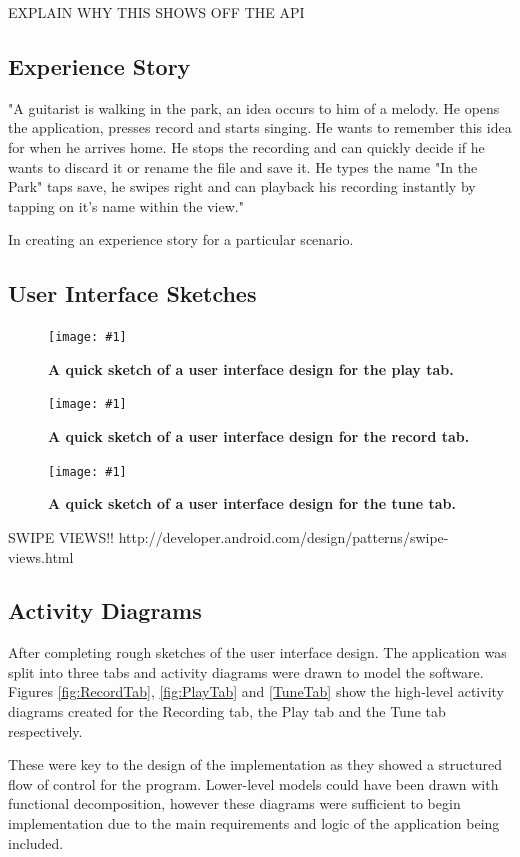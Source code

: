 \documentclass[conference]{acmsiggraph}
\newcommand{\figuremacroF}[3]{
	\begin{figure}[H] %
		\centering
		\texttt{[image: \#1]}
		\caption[#2]{\textbf{#2}}
		\label{fig:#1}
	\end{figure}
}
\begin{document}
EXPLAIN WHY THIS SHOWS OFF THE API


\subsection{Experience Story}

"A guitarist is walking in the park, an idea occurs to him of a melody. He opens the application, presses record and starts singing. He wants to remember this idea for when he arrives home. He stops the recording and can quickly decide if he wants to discard it or rename the file and save it. He types the name "In the Park" taps save, he swipes right and can playback his recording instantly by tapping on it's name within the view." 

In creating an experience story for a particular scenario. %

\subsection{User Interface Sketches}

\figuremacroF
{playSketch}
{A quick sketch of a user interface design for the play tab.}
{1.0}

\figuremacroF
{recordSketch}
{A quick sketch of a user interface design for the record tab.}
{1.0}

\figuremacroF
{tuneSketch}
{A quick sketch of a user interface design for the tune tab.}
{1.0}

SWIPE VIEWS!!
http://developer.android.com/design/patterns/swipe-views.html

\subsection{Activity Diagrams}

After completing rough sketches of the user interface design. The application was split into three tabs and activity diagrams were drawn to model the software. Figures \ref{fig:RecordTab}, \ref{fig:PlayTab} and \ref{TuneTab} show the high-level activity diagrams created for the Recording tab, the Play tab and the Tune tab respectively.

These were key to the design of the implementation as they showed a structured flow of control for the program. Lower-level models could have been drawn with functional decomposition, however these diagrams were sufficient to begin implementation due to the main requirements and logic of the application being included.
\end{document}
